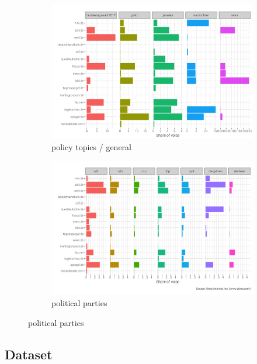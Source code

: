 \documentclass[12pt,a4paper,notitlepage]{article}
\begin{document}
\begin{figure}[H]
	\caption{Market share for different keywords}
	\begin{center}
		\begin{subfigure}[normla]{0.7\textwidth}
			\includegraphics[width=\textwidth]{../figs/keywords1.png}
			\caption{policy topics / general}
			\label{fig_keywords1}
		\end{subfigure}
		\begin{subfigure}[normla]{0.7\textwidth}
			\includegraphics[width=\textwidth]{../figs/keywords2.png}
			\caption{political parties}
			\label{fig_keywords2}
		\end{subfigure}
	\end{center}
\end{figure}

\subsection{Dataset}\label{ch_data}
\end{document}
